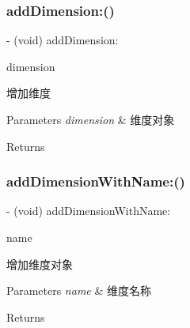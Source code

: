 \subsubsection{\texorpdfstring{add\+Dimension\+:()}{addDimension:()}}
{\footnotesize\ttfamily -\/ (void) add\+Dimension\+: \begin{DoxyParamCaption}\item[{(\mbox{\hyperlink{interface_app_monitor_dimension}{App\+Monitor\+Dimension}} $\ast$)}]{dimension }\end{DoxyParamCaption}}

增加维度


\begin{DoxyParams}{Parameters}
{\em dimension} & 维度对象 \\
\hline
\end{DoxyParams}
\begin{DoxyReturn}{Returns}

\end{DoxyReturn}
\mbox{\label{interface_app_monitor_dimension_set_a870cca90ab09746a0ae54cdbe10e0327}} 
\subsubsection{\texorpdfstring{add\+Dimension\+With\+Name\+:()}{addDimensionWithName:()}}
{\footnotesize\ttfamily -\/ (void) add\+Dimension\+With\+Name\+: \begin{DoxyParamCaption}\item[{(N\+S\+String $\ast$)}]{name }\end{DoxyParamCaption}}

增加维度对象


\begin{DoxyParams}{Parameters}
{\em name} & 维度名称 \\
\hline
\end{DoxyParams}
\begin{DoxyReturn}{Returns}

\end{DoxyReturn}
\mbox{\label{interface_app_monitor_dimension_set_a8a5e89b28f399eea797953e6e2420330}} 
